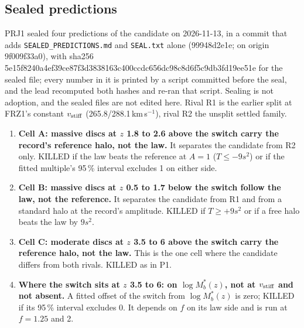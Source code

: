 \documentclass[10pt]{article}
\begin{document}
\subsection{Sealed predictions}
PRJ1 sealed four predictions of the candidate on 2026-11-13, in a commit that adds \texttt{SEALED\_PREDICTIONS.md} and \texttt{SEAL.txt} alone (99948d2e1e; on origin 9f009f33a0), with sha256 5e15f8240a4ef39ce87f3d3838163c400ccdc656dc98c8d6f5c9db3fd19ee51e for the sealed file; every number in it is printed by a script committed before the seal, and the lead recomputed both hashes and re-ran that script. Sealing is not adoption, and the sealed files are not edited here. Rival R1 is the earlier split at FRZ1's constant $v_{\rm stiff}$ (265.8/288.1\,km\,s$^{-1}$), rival R2 the unsplit settled family.
\begin{enumerate}[label=P\arabic*.]
\item \textbf{Cell A: massive discs at $z$ 1.8 to 2.6 above the switch carry the record's reference halo, not the law.} It separates the candidate from R2 only. KILLED if the law beats the reference at $A=1$ ($T\le-9s^2$) or if the fitted multiple's 95\,\% interval excludes 1 on either side.
\item \textbf{Cell B: massive discs at $z$ 0.5 to 1.7 below the switch follow the law, not the reference.} It separates the candidate from R1 and from a standard halo at the record's amplitude. KILLED if $T\ge+9s^2$ or if a free halo beats the law by $9s^2$.
\item \textbf{Cell C: moderate discs at $z$ 3.5 to 6 above the switch carry the reference halo, not the law.} This is the one cell where the candidate differs from both rivals. KILLED as in P1.
\item \textbf{Where the switch sits at $z$ 3.5 to 6: on $\log M_b^*(z)$, not at $v_{\rm stiff}$ and not absent.} A fitted offset of the switch from $\log M_b^*(z)$ is zero; KILLED if its 95\,\% interval excludes 0. It depends on $f$ on its law side and is run at $f=1.25$ and 2.
\end{enumerate}
\end{document}
